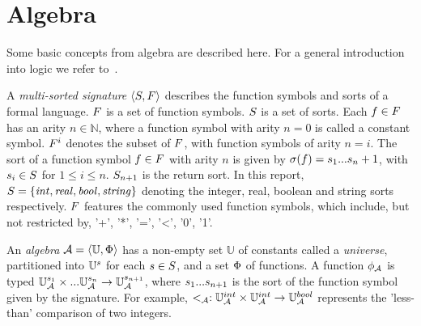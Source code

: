 \section{Algebra}\label{sec:algebra}

Some basic concepts from algebra are described here. For a general introduction into logic we refer to~\cite{Huth:logic}.

A \textit{multi-sorted signature} $\langle S, F \rangle$ describes the function symbols and sorts of a formal language. $F$ is a set of function symbols. $S$ is a set of sorts. Each $f \in F$ has an arity $n \in \mathbb{N}$, where a function symbol with arity $n = 0$ is called a constant symbol. $F^i$ denotes the subset of $F$, with function symbols of arity $n = i$. The sort of a function symbol $f \in F$ with arity $n$ is given by $\sigma(f) = s_1 ... s_n+1$, with $s_i \in S$ for $1 \leq i \leq n$. $S_{n+1}$ is the return sort. In this report, $S =  \{\mathit{int, real, bool, string}\}$ denoting the integer, real, boolean and string sorts respectively. $F$ features the commonly used function symbols, which include, but not restricted by, '+', '*', '=', '<', '0', '1'.

An \textit{algebra} $\mathcal{A} = \langle \mathbb{U}, \Phi\rangle$ has a non-empty set $\mathbb{U}$ of constants called a \textit{universe}, partitioned into $\mathbb{U}^s$ for each $s \in S$, and a set $\Phi$ of functions. A function $\phi_{\mathcal{A}}$ is typed $\mathbb{U}_{\mathcal{A}}^{s_1} \times ... \mathbb{U}_{\mathcal{A}}^{s_n} \rightarrow \mathbb{U}_{\mathcal{A}}^{s_{n+1}}$, where $s_1 ... s_{n+1}$ is the sort of the function symbol given by the signature. For example, $<_{\mathcal{A}}: \mathbb{U}_{\mathcal{A}}^{int} \times \mathbb{U}_{\mathcal{A}}^{int} \rightarrow \mathbb{U}_{\mathcal{A}}^{bool}$ represents the 'less-than' comparison of two integers.
 
